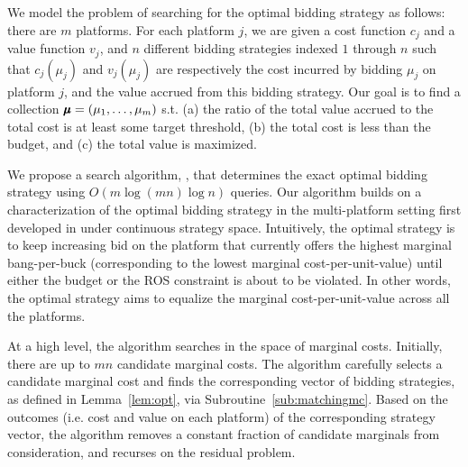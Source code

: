 We model the problem of searching for the optimal bidding strategy as follows: there are $m$ platforms. For each platform $j$, we are given a cost function $c_j$ and a value function $v_j$, and $n$ different bidding strategies indexed $1$ through $n$ such that $c_j(\mu_j)$ and $v_j(\mu_j)$ are respectively the cost incurred by bidding $\mu_j$ on platform $j$, and the value accrued from this bidding strategy. 
Our goal is to find a collection $\pmb{\mu} = (\mu_1, \ldots, \mu_m)$ s.t. (a) the ratio of the total value accrued to the total cost is at least some target threshold, (b) the total cost is less than the budget, and (c) the total value is maximized. 

We propose a search algorithm, \mom, that determines the exact optimal bidding strategy using \(O(m \log (mn) \log n)\) queries. Our algorithm builds on a characterization of the optimal bidding strategy in the multi-platform setting first developed in \cite{APSZ24} under continuous strategy space.
Intuitively, the optimal strategy is to keep increasing bid on the platform that currently offers the highest marginal bang-per-buck (corresponding to the lowest marginal cost-per-unit-value) until
either the budget or 
the ROS constraint is about to be violated.
In other words, the optimal strategy aims to equalize the marginal cost-per-unit-value across all the platforms. 

At a high level, the algorithm searches in the space of marginal costs. Initially, there are up to $mn$ candidate marginal costs.  The algorithm carefully selects a candidate marginal cost and finds the corresponding vector of bidding strategies, as defined in Lemma~\ref{lem:opt}, via Subroutine~\ref{sub:matchingmc}. Based on the outcomes (i.e. cost and value on each platform) of the corresponding strategy vector, the algorithm removes a constant fraction of candidate marginals from consideration, and recurses on the residual problem. 

